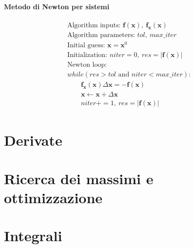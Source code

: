 \subsubsection{Metodo di Newton per sistemi}
\begin{equation}
\begin{aligned}
& \text{Algorithm inputs: } \mathbf{f}(\mathbf{x}), \ \mathbf{f}_\mathbf{x}(\mathbf{x}) \\
& \text{Algorithm parameters: } tol, \ max\_iter \\
& \text{Initial guess: } \mathbf{x} = \mathbf{x}^0 \\
& \text{Initialization: } niter = 0, \ res = |\mathbf{f}(\mathbf{x})| \\
& \text{Newton loop: } \\
& while ( res > tol \text{ and } niter < max\_iter ): \\ 
& \qquad \mathbf{f}_{\mathbf{x}}(\mathbf{x}) \Delta \mathbf{x} = - \mathbf{f}(\mathbf{x}) \\
& \qquad \mathbf{x} \leftarrow \mathbf{x} + \Delta \mathbf{x} \\
& \qquad niter += 1, \ res = |\mathbf{f}(\mathbf{x})| \\
\end{aligned}
\end{equation}

\chapter{Derivate}
\section{}

\chapter{Ricerca dei massimi e ottimizzazione}
\section{}

\chapter{Integrali}
